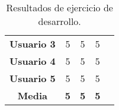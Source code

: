 \begin{table}[H]
{\begin{tabular}{c|ccc|l}
            \multicolumn{1}{|c|}{\textbf{Usuario 3}} & \multicolumn{1}{c|}{5}                                                                                                                                          & \multicolumn{1}{c|}{5}                                                                                                                                                                 & 5                                                                                                                                                                                   & \\ \cline{1-4}
            \multicolumn{1}{|c|}{\textbf{Usuario 4}} & \multicolumn{1}{c|}{5}                                                                                                                                          & \multicolumn{1}{c|}{5}                                                                                                                                                                 & 5                                                                                                                                                                                   & \\ \cline{1-4}
            \multicolumn{1}{|c|}{\textbf{Usuario 5}} & \multicolumn{1}{c|}{5}                                                                                                                                          & \multicolumn{1}{c|}{5}                                                                                                                                                                 & 5                                                                                                                                                                                   & \\ \cline{1-4}
            \multicolumn{1}{|c|}{\textbf{Media}}     & \multicolumn{1}{c|}{\textbf{5}}                                                                                                                                 & \multicolumn{1}{c|}{\textbf{5}}                                                                                                                                                        & \textbf{5}                                                                                                                                                                          & \\ \cline{1-4}
        \end{tabular}
    }
    \caption{Resultados de ejercicio de desarrollo.}
    \label{tab:resultadosDesarrollo}
\end{table}

